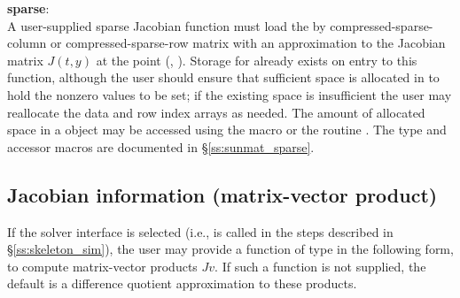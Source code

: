 {  {\bf sparse}:\\
  A user-supplied sparse Jacobian function must load the  by 
  compressed-sparse-column or compressed-sparse-row matrix 
  with an approximation to the Jacobian matrix $J(t,y)$ at the point
  (, ).  Storage for  already exists on entry to
  this function, although the user should ensure that sufficient space
  is allocated in  to hold the nonzero values to be set; if
  the existing space is insufficient the user may reallocate the data
  and row index arrays as needed.  The amount of allocated space in a
  {\sunmatsparse} object may be accessed using the macro
   or the routine .  The
  {\sunmatsparse} type and accessor macros are documented in 
  \S\ref{ss:sunmat_sparse}. 
}


\subsection{Jacobian information (matrix-vector product)}\label{ss:jtimesFn}

If the {\cvspils} solver interface is selected
(i.e.,  is called in the steps described in
\S\ref{ss:skeleton_sim}), the user may
provide a function of type  in the following form,
to compute matrix-vector products $Jv$. If such a function is not supplied,
the default is a difference quotient approximation to these products.

